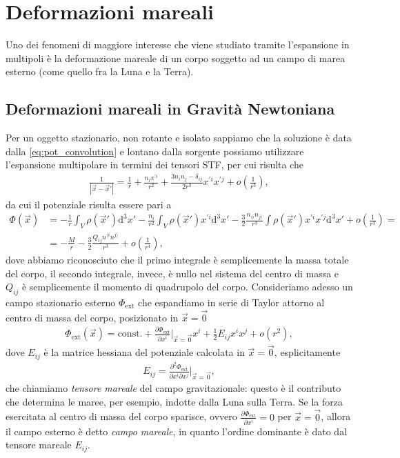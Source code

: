 \chapter{Deformazioni mareali}

Uno dei fenomeni di maggiore interesse che viene studiato tramite l'espansione in multipoli è la deformazione mareale di un corpo soggetto ad un campo di marea esterno (come quello fra la Luna e la Terra).

\section{Deformazioni mareali in Gravità Newtoniana}

Per un oggetto stazionario, non rotante e isolato sappiamo che la soluzione è data dalla \eqref{eq:pot_convolution} e lontano dalla sorgente possiamo utilizzare l'espansione multipolare in termini dei tensori STF, per cui risulta che
\begin{align}
	\frac{1}{|\vec{x} - \vec{x}'|} = \frac{1}{r} + \frac{n_i x^{'i}}{r^2} + \frac{3n_i n_j - \delta_{ij}}{2r^3} x^{' i} x^{' j} + o \left( \frac{1}{r^3} \right),
\end{align}
da cui il potenziale risulta essere pari a
\begin{align}
	\Phi(\vec{x}) &= - \frac{1}{r} \int_V \rho(\vec{x}') \mathrm{d}^3 x' - \frac{n_i}{r^2} \int_V \rho(\vec{x}') x^{' i} \mathrm{d}^3 x' - \frac{3}{2} \frac{n_{\langle i} n_{j \rangle}}{r^3} \int \rho(\vec{x}') x^{' i} x^{' j} \mathrm{d}^3 x' + o \left( \frac{1}{r^3} \right) = \\
		      &= - \frac{M}{r} - \frac{3}{2} \frac{Q_{ij} n^{\langle i} n^{j \rangle}}{r^3} + o \left( \frac{1}{r^4} \right),
\end{align}
dove abbiamo riconosciuto che il primo integrale è semplicemente la massa totale del corpo, il secondo integrale, invece, è nullo nel sistema del centro di massa e $Q_{ij}$ è semplicemente il momento di quadrupolo del corpo. Consideriamo adesso un campo stazionario esterno $\Phi_{\text{ext}}$ che espandiamo in serie di Taylor attorno al centro di massa del corpo, posizionato in $\vec{x} = \vec{0}$
\begin{align}
	\Phi_{\text{ext}}(\vec{x}) = \text{const.} + \frac{\partial \Phi_{\text{ext}}}{\partial x^i}\Bigg|_{\vec{x}=\vec{0}}x^i + \frac{1}{2} E_{ij} x^i x^j + o(r^2),
\end{align}
dove $E_{ij}$ è la matrice hessiana del potenziale calcolata in $\vec{x}=\vec{0}$, esplicitamente
\begin{align}
	E_{ij} = \frac{\partial^2 \Phi_{\text{ext}}}{\partial x^i \partial x^j} \Bigg|_{\vec{x}=\vec{0}},
\end{align}
che chiamiamo \emph{tensore mareale} del campo gravitazionale: questo è il contributo che determina le maree, per esempio, indotte dalla Luna sulla Terra. Se la forza esercitata al centro di massa del corpo sparisce, ovvero $\frac{\partial \Phi_{\text{ext}}}{\partial x^i} = 0$ per $\vec{x}=\vec{0}$, allora il campo esterno è detto \emph{campo mareale}, in quanto l'ordine dominante è dato dal tensore mareale $E_{ij}$.

